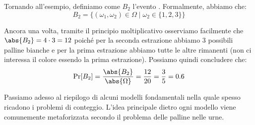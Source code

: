 \documentclass[a4paper, 12pt]{report}
\begin{document}
    Tornando all'esempio, definiamo come $B_2$ l'evento . Formalmente, abbiamo che:
    \[B_2 = \{(\omega_1,\omega_2) \in \Omega \mid \omega_2 \in \{1,2,3\}\}\]
    
    Ancora una volta, tramite il principio moltiplicativo osserviamo facilmente che $\abs{B_2} = 4 \cdot 3 = 12$ poiché per la seconda estrazione abbiamo 3 possibili palline bianche e per la prima estrazione abbiamo tutte le altre rimanenti (non ci interessa il colore essendo la prima estrazione). Possiamo quindi concludere che:
    \[\Pr[B_2] = \frac{\abs{B_2}}{\abs{\Omega}} = \frac{12}{20} = \frac{3}{5} = 0.6\]
    
    Passiamo adesso al riepilogo di alcuni modelli fondamentali nella quale spesso ricadono i problemi di conteggio. L'idea principale dietro ogni modello viene comunemente metaforizzata secondo il problema delle palline nelle urne.
\end{document}
